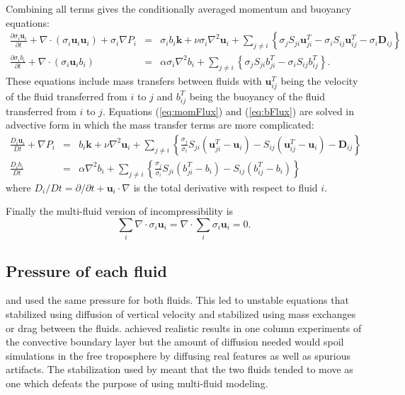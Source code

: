 \documentclass[draft]{agujournal2019}
\begin{document}
Combining all terms gives the conditionally averaged momentum and buoyancy equations:
\begin{eqnarray}
\frac{\partial\sigma_i\mathbf{u}_{i}}{\partial t} + 
\nabla\cdot(\sigma_i \mathbf{u}_{i} \mathbf{u}_{i})
+ \sigma_i \nabla P_{i}
& = &
\sigma_i b_{i}\mathbf{k}
+
\nu\sigma_i\nabla^{2}\mathbf{u}_{i}
+
\sum_{j\ne i}\left\{
     \sigma_{j} S_{ji}\mathbf{u}_{ji}^{T}
   - \sigma_{i} S_{ij}\mathbf{u}_{ij}^{T}
   - \sigma_{i}\mathbf{D}_{ij}\right\}
\label{eq:momFlux}\\
\frac{\partial\sigma_i b_{i}}{\partial t} + 
\nabla\cdot(\sigma_i \mathbf{u}_{i} b_{i})
& = &
\alpha\sigma_i\nabla^{2}b_{i}
+
\sum_{j\ne i}\left\{
    \sigma_{j} S_{ji} b_{ji}^{T}
  - \sigma_{i} S_{ij} b_{ij}^{T}
\right\}.
\label{eq:bFlux}
\end{eqnarray}
These equations include mass transfers between fluids with $\mathbf{u}_{ij}^T$ being the velocity of the fluid transferred from $i$ to $j$ and $b_{ij}^T$ being the buoyancy of the fluid transferred from $i$ to $j$. 
Equations (\ref{eq:momFlux}) and (\ref{eq:bFlux}) are solved in advective form in which the mass transfer terms are more complicated: 
\begin{eqnarray}
\frac{D_{i}\mathbf{u}_{i}}{Dt}+\nabla P_{i}
& = &
b_{i}\mathbf{k}+\nu\nabla^{2}\mathbf{u}_{i}+\sum_{j\ne i}\left\{ \frac{\sigma_{j}}{\sigma_{i}}S_{ji}\left(\mathbf{u}_{ji}^{T}-\mathbf{u}_{i}\right)-S_{ij}(\mathbf{u}_{ij}^{T}-\mathbf{u}_{i})-\mathbf{D}_{ij}\right\}
\label{eq:mom}\\
\frac{D_{i}b_{i}}{Dt}
& = &
\alpha\nabla^{2}b_{i}+\sum_{j\ne i}\left\{ \frac{\sigma_{j}}{\sigma_{i}}S_{ji}\left(b_{ji}^{T}-b_{i}\right)-S_{ij}\left(b_{ij}^{T}-b_{i}\right)\right\} \label{eq:b}
\end{eqnarray}
where $D_{i}\big/Dt=\partial/\partial t+\mathbf{u}_{i}\cdot\nabla$ is the total derivative with respect to fluid $i$.

Finally the multi-fluid version of incompressibility is
\begin{equation}
\sum_{i}\nabla\cdot\sigma_{i}\mathbf{u}_{i}  = \nabla\cdot\sum_{i}\sigma_{i}\mathbf{u}_{i}=0.
\label{eq:divFree}
\end{equation}

\subsection{Pressure of each fluid \label{subsec:fluidPressure}}

 and 
used the same pressure for both fluids.
This led to unstable equations that 
stabilized using diffusion of vertical velocity and 
stabilized using mass exchanges or drag between the fluids. 
achieved realistic results in one column experiments of the convective
boundary layer but the amount of diffusion needed would spoil simulations
in the free troposphere by diffusing real features as well as spurious artifacts. The stabilization used by  meant
that the two fluids tended to move as one which defeats the purpose
of using multi-fluid modeling. 
\end{document}
